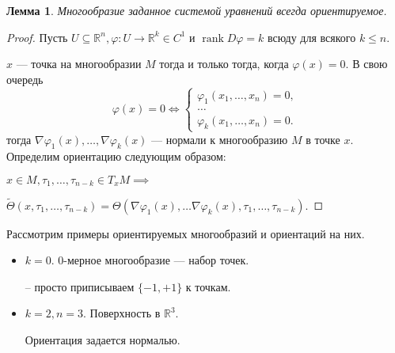 \documentclass[a5paper]{article}
\newcounter{through}
\theoremstyle{plain}
\newtheorem{lemma}[through]{Лемма}
\theoremstyle{definition}
\numberwithin{through}{section}
\numberwithin{equation}{section}
\DeclareMathOperator{\rank}{rank}
\begin{document}
\begin{lemma}\label{OrientationSysEqTh}
	Многообразие заданное системой уравнений всегда ориентируемое.
\end{lemma}

\begin{proof}
Пусть $U \subseteq \mathbb{R}^n, \varphi: U \to \mathbb{R}^k \in C^1$ и $\rank D\varphi = k$ всюду для всякого $k \leq n$. 


$x$ --- точка на многообразии $M$ тогда и только тогда, когда $\varphi(x) = 0$. 
В свою очередь 
\begin{equation*}
	\varphi(x) = 0 \iff
	\begin{cases}
	\varphi_1(x_1,\ldots,x_n) = 0, \\
	\ldots \\
	\varphi_k(x_1,\ldots, x_n) = 0.
	\end{cases}
\end{equation*}	
тогда $\nabla \varphi_1(x),\ldots,\nabla \varphi_k(x)$ --- нормали к
многообразию $M$ в точке $x$.
Определим ориентацию следующим образом:

$x \in M, \tau_1,\ldots,\tau_{n-k} \in T_x M \implies $

$\tilde{\Theta}(x,\tau_1,\ldots,\tau_{n-k}) = \Theta(\nabla\varphi_1(x),\ldots
\nabla\varphi_k(x),\tau_1,\ldots,\tau_{n-k}).$
\end{proof}

Рассмотрим примеры ориентируемых многообразий и ориентаций на них.

\begin{itemize}
	\item
	$k = 0$. $0$-мерное многообразие --- набор точек.
	\begin{center}

	\end{center}
-- просто приписываем $\{-1,+1\}$ к точкам.

\item
$k = 2, n = 3$. Поверхность в $\mathbb{R}^3$.

Ориентация задается нормалью. 
\end{itemize}
\end{document}
